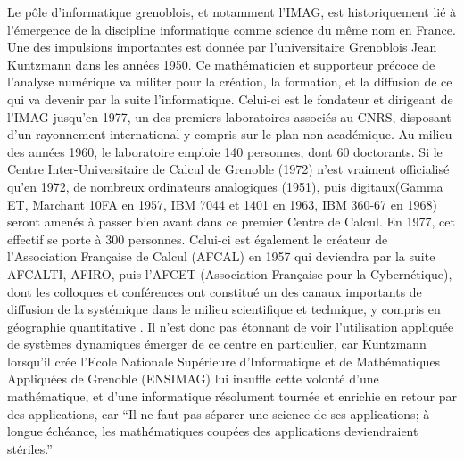 Le pôle d'informatique grenoblois, et notamment l'IMAG, est historiquement lié à l'émergence de la discipline informatique comme science du même nom en France. Une des impulsions importantes est donnée par l'universitaire Grenoblois Jean Kuntzmann dans les années 1950. Ce mathématicien et supporteur précoce de l'analyse numérique va militer pour la création, la formation, et la diffusion de ce qui va devenir par la suite l'informatique. Celui-ci est le fondateur et dirigeant de l'IMAG jusqu'en 1977, un des premiers laboratoires associés au CNRS, disposant d'un rayonnement international y compris sur le plan non-académique. Au milieu des années 1960, le laboratoire emploie 140 personnes, dont 60 doctorants. Si le Centre Inter-Universitaire de Calcul de Grenoble (1972) n'est vraiment officialisé qu'en 1972, de nombreux ordinateurs analogiques (1951), puis digitaux(Gamma ET, Marchant 10FA en 1957, IBM 7044 et 1401 en 1963, IBM 360-67 en 1968) seront amenés à passer bien avant dans ce premier Centre de Calcul. En 1977, cet effectif se porte à 300 personnes. Celui-ci est également le créateur de l'Association Française de Calcul (AFCAL) en 1957 qui deviendra par la suite AFCALTI, AFIRO, puis l'AFCET (Association Française pour la Cybernétique), dont les colloques et conférences ont constitué un des canaux importants de diffusion de la systémique dans le milieu scientifique et technique, y compris en géographie quantitative \autocite{Pumain2003}. Il n'est donc pas étonnant de voir l'utilisation appliquée de systèmes dynamiques émerger de ce centre en particulier, car Kuntzmann lorsqu'il crée l'Ecole Nationale Supérieure d'Informatique et de Mathématiques Appliquées de Grenoble (ENSIMAG) lui insuffle cette volonté d'une mathématique, et d'une informatique résolument tournée et enrichie en retour par des applications, car \enquote{Il ne faut pas séparer une science de ses applications; à longue échéance, les mathématiques coupées des applications deviendraient stériles.} \autocites[422]{Mounier2012}{Chiffres1977}

